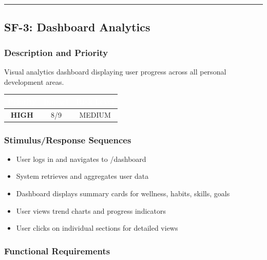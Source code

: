 \documentclass[12pt,a4paper]{article}
\begin{document}
\vspace{1em}
\hrule

\subsection{SF-3: Dashboard Analytics}

\subsubsection{Description and Priority}
Visual analytics dashboard displaying user progress across all personal development areas.

\vspace{0.3em}
\begin{center}
\begin{tabular}{|c|c|c|}
\hline
\rowcolor{accentblue}
\textcolor{white}{\textbf{Priority}} & \textcolor{white}{\textbf{Impact}} & \textcolor{white}{\textbf{Risk Level}} \\
\hline
\rowcolor{lightgray}
\textbf{\textcolor{deepblue}{HIGH}} & 8/9 & MEDIUM \\
\hline
\end{tabular}
\end{center}

\subsubsection{Stimulus/Response Sequences}
\begin{itemize}
    \item User logs in and navigates to /dashboard
    \item System retrieves and aggregates user data
    \item Dashboard displays summary cards for wellness, habits, skills, goals
    \item User views trend charts and progress indicators
    \item User clicks on individual sections for detailed views
\end{itemize}

\subsubsection{Functional Requirements}
\end{document}
